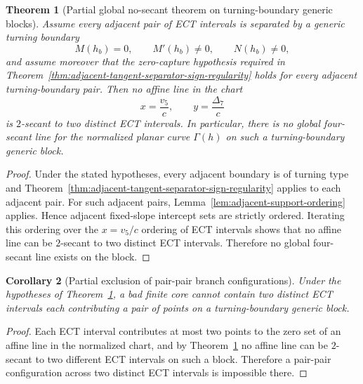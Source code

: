 \documentclass[11pt,a4paper]{amsart}
\theoremstyle{plain}
\newtheorem{theorem}{Theorem}[section]
\newtheorem{corollary}[theorem]{Corollary}
\theoremstyle{definition}
\begin{document}
\begin{theorem}[Partial global no-secant theorem on turning-boundary generic blocks]
\label{thm:partial-global-no-secant}
Assume every adjacent pair of ECT intervals is separated by a generic turning
boundary
\[
M(h_b)=0,\qquad M'(h_b)\neq 0,\qquad N(h_b)\neq 0,
\]
and assume moreover that the zero-capture hypothesis required in
Theorem~\ref{thm:adjacent-tangent-separator-sign-regularity} holds for every
adjacent turning-boundary pair.
Then no affine line in the chart
\[
x=\frac{v_5}{c},
\qquad
y=\frac{\Delta_7}{c}
\]
is $2$-secant to two distinct ECT intervals. In particular, there is no
global four-secant line for the normalized planar curve $\Gamma(h)$ on such
a turning-boundary generic block.
\end{theorem}

\begin{proof}
Under the stated hypotheses, every adjacent boundary is of turning type and
Theorem~\ref{thm:adjacent-tangent-separator-sign-regularity} applies to each
adjacent pair.
For such adjacent pairs, Lemma~\ref{lem:adjacent-support-ordering} applies.
Hence adjacent fixed-slope intercept sets are strictly ordered. Iterating this
ordering over the $x=v_5/c$ ordering of ECT intervals shows that no affine
line can be $2$-secant to two distinct ECT intervals. Therefore no global
four-secant line exists on the block.
\end{proof}

\begin{corollary}[Partial exclusion of pair-pair branch configurations]
\label{cor:pair-pair-exclusion}
Under the hypotheses of Theorem~\ref{thm:partial-global-no-secant}, a bad
finite core cannot contain two distinct ECT intervals each contributing a pair
of points on a turning-boundary generic block.
\end{corollary}

\begin{proof}
Each ECT interval contributes at most two points to the zero set of an affine
line in the normalized chart, and by
Theorem~\ref{thm:partial-global-no-secant} no affine line can be $2$-secant
to two different ECT intervals on such a block. Therefore a pair-pair
configuration across two distinct ECT intervals is impossible there.
\end{proof}
\end{document}
